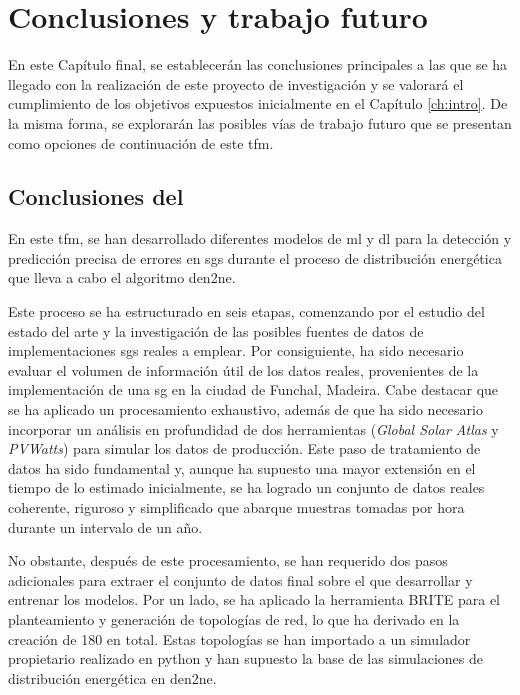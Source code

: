 \chapter{Conclusiones y trabajo futuro}
\label{conclusiones}

En este Capítulo final, se establecerán las conclusiones principales a las que se ha llegado con la realización de este proyecto de investigación y se valorará el cumplimiento de los objetivos expuestos inicialmente en el Capítulo \ref{ch:intro}. De la misma forma, se explorarán las posibles vías de trabajo futuro que se presentan como opciones de continuación de este \gls{tfm}.

\section{Conclusiones del }

En este \gls{tfm}, se han desarrollado diferentes modelos de \gls{ml} y \gls{dl} para la detección y predicción precisa de errores en \gls{sg}s durante el proceso de distribución energética que lleva a cabo el algoritmo \gls{den2ne}. 

\vspace{3mm}

Este proceso se ha estructurado en seis etapas, comenzando por el estudio del estado del arte y la investigación de las posibles fuentes de datos de implementaciones \gls{sg}s reales a emplear. Por consiguiente, ha sido necesario evaluar el volumen de información útil de los datos reales, provenientes de la implementación de una \gls{sg} en la ciudad de Funchal, Madeira. Cabe destacar que se ha aplicado un procesamiento exhaustivo, además de que ha sido necesario incorporar un análisis en profundidad de dos herramientas (\textit{Global Solar Atlas} y \textit{PVWatts}) para simular los datos de producción. Este paso de tratamiento de datos ha sido fundamental y, aunque ha supuesto una mayor extensión en el tiempo de lo estimado inicialmente, se ha logrado un conjunto de datos reales coherente, riguroso y simplificado que abarque muestras tomadas por hora durante un intervalo de un año.

\vspace{3mm}

No obstante, después de este procesamiento, se han requerido dos pasos adicionales para extraer el conjunto de datos final sobre el que desarrollar y entrenar los modelos. Por un lado, se ha aplicado la herramienta BRITE para el planteamiento y generación de topologías de red, lo que ha derivado en la creación de 180 en total. Estas topologías se han importado a un simulador propietario realizado en python y han supuesto la base de las simulaciones de distribución energética en \gls{den2ne}. 

